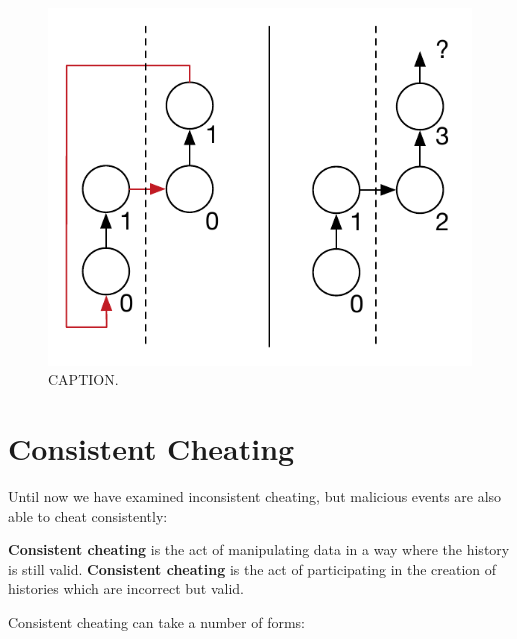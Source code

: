     \begin{figure}[H]
		\centering
		\includegraphics[]{5validation/images/cycle-prevention.pdf}
		\caption{CAPTION.}
		\label{fig:validation:cycle-prevention}
	\end{figure}
	
	\section{Consistent Cheating}
	Until now we have examined inconsistent cheating, but malicious events are also able to cheat consistently:
	\begin{definition}
		\textbf{Consistent cheating} is the act of manipulating data in a way where the history is still valid.
		\textbf{Consistent cheating} is the act of participating in the creation of histories which are incorrect but valid.
	\end{definition}
	
	\newpar Consistent cheating can take a number of forms:

